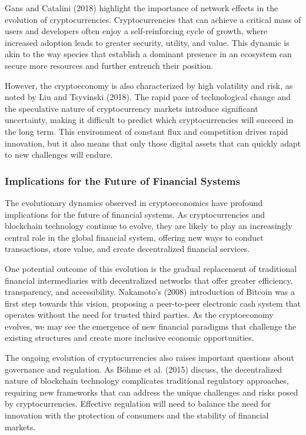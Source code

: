 \documentclass[12pt,twoside]{article}
\begin{document}
Gans and Catalini (2018) highlight the importance of network effects in the evolution of cryptocurrencies. Cryptocurrencies that can achieve a critical mass of users and developers often enjoy a self-reinforcing cycle of growth, where increased adoption leads to greater security, utility, and value. This dynamic is akin to the way species that establish a dominant presence in an ecosystem can secure more resources and further entrench their position.

However, the cryptoeconomy is also characterized by high volatility and risk, as noted by Liu and Tsyvinski (2018). The rapid pace of technological change and the speculative nature of cryptocurrency markets introduce significant uncertainty, making it difficult to predict which cryptocurrencies will succeed in the long term. This environment of constant flux and competition drives rapid innovation, but it also means that only those digital assets that can quickly adapt to new challenges will endure.

\subsubsection{Implications for the Future of Financial Systems}

The evolutionary dynamics observed in cryptoeconomics have profound implications for the future of financial systems. As cryptocurrencies and blockchain technology continue to evolve, they are likely to play an increasingly central role in the global financial system, offering new ways to conduct transactions, store value, and create decentralized financial services.

One potential outcome of this evolution is the gradual replacement of traditional financial intermediaries with decentralized networks that offer greater efficiency, transparency, and accessibility. Nakamoto's (2008) introduction of Bitcoin was a first step towards this vision, proposing a peer-to-peer electronic cash system that operates without the need for trusted third parties. As the cryptoeconomy evolves, we may see the emergence of new financial paradigms that challenge the existing structures and create more inclusive economic opportunities.

The ongoing evolution of cryptocurrencies also raises important questions about governance and regulation. As Böhme et al. (2015) discuss, the decentralized nature of blockchain technology complicates traditional regulatory approaches, requiring new frameworks that can address the unique challenges and risks posed by cryptocurrencies. Effective regulation will need to balance the need for innovation with the protection of consumers and the stability of financial markets.
\end{document}
